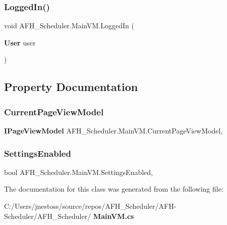 \subsubsection{LoggedIn()}
{\footnotesize\ttfamily void A\+F\+H\+\_\+\+Scheduler.\+Main\+V\+M.\+Logged\+In (\begin{DoxyParamCaption}\item[{\textbf{ User}}]{user }\end{DoxyParamCaption})}



\subsection{Property Documentation}
\mbox{\label{class_a_f_h___scheduler_1_1_main_v_m_ae12e9d96e0f3f7261d24cbcab17ee71d}} 
\subsubsection{CurrentPageViewModel}
{\footnotesize\ttfamily \textbf{ I\+Page\+View\+Model} A\+F\+H\+\_\+\+Scheduler.\+Main\+V\+M.\+Current\+Page\+View\+Model\hspace{0.3cm}{\ttfamily [get]}, {\ttfamily [set]}}

\mbox{\label{class_a_f_h___scheduler_1_1_main_v_m_a154f34407f28855ec6305414581fe971}} 
\subsubsection{SettingsEnabled}
{\footnotesize\ttfamily bool A\+F\+H\+\_\+\+Scheduler.\+Main\+V\+M.\+Settings\+Enabled\hspace{0.3cm}{\ttfamily [get]}, {\ttfamily [set]}}



The documentation for this class was generated from the following file\+:\begin{DoxyCompactItemize}
\item 
C\+:/\+Users/jnestoss/source/repos/\+A\+F\+H\+\_\+\+Scheduler/\+A\+F\+H-\/\+Scheduler/\+A\+F\+H\+\_\+\+Scheduler/\textbf{ Main\+V\+M.\+cs}\end{DoxyCompactItemize}
